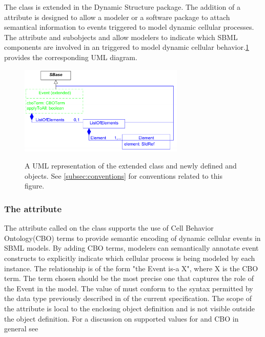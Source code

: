 The \Event class is extended in the Dynamic Structure package. The addition of a  attribute is designed to allow a modeler or a software package to attach semantical information to events triggered to model dynamic cellular processes. The  attribute and subobjects \ListOfElements and \Element allow modelers to indicate which SBML components are involved in an \Event triggered to model dynamic cellular behavior.\ref{fig:UMLExtendedEvent} provides the corresponding UML diagram. 

\begin{figure}[tbhp]
  \centering
  \includegraphics[width=0.70\textwidth]{images/UMLExtendedEvent.pdf}\\
  \caption{A UML representation of the extended \Event class and newly defined \ListOfElements and \Element objects. See \ref{subsec:conventions} for conventions related to this figure.} \label{fig:UMLExtendedEvent}
\end{figure}

\subsubsection{The  attribute}
\label{attr:cboTerm}

The attribute called  on the \Event class supports the use of Cell Behavior Ontology(CBO) terms to provide semantic encoding of dynamic cellular events in SBML models. By adding CBO terms, modelers can semantically annotate event constructs to explicitly indicate which cellular process is being modeled by each \Event instance. The relationship is of the form "the Event is-a X", where X is the CBO term. The term chosen should be the most precise one that captures the role of the Event in the model. The value of  must conform to the syntax permitted by the  data type previously described in  of the current specification. The scope of the  attribute is local to the enclosing object definition and is not visible outside the object definition. For a discussion on supported values for  and CBO in general see 

